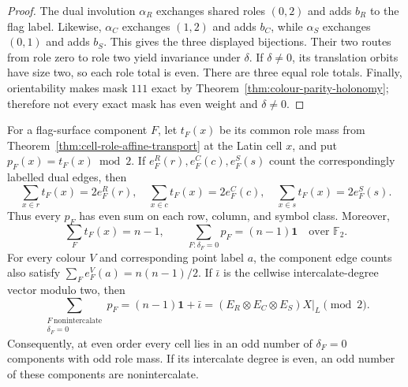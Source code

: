 \begin{proof}
The dual involution $\alpha_R$ exchanges shared roles $(0,2)$ and adds
$b_R$ to the flag label.  Likewise, $\alpha_C$ exchanges $(1,2)$ and adds
$b_C$, while $\alpha_S$ exchanges $(0,1)$ and adds $b_S$.  This gives the
three displayed bijections.
Their two routes from role zero to role two yield invariance under $\delta$.
If $\delta\ne0$, its translation orbits have size two, so each role total is
even.  There are three equal role totals.  Finally, orientability makes mask
$111$ exact by Theorem~\ref{thm:colour-parity-holonomy}; therefore not every
exact mask has even weight and $\delta\ne0$.
\end{proof}

\begin{theorem}
\label{thm:cross-component-cell-parity}
For a flag-surface component $F$, let $t_F(x)$ be its common role mass from
Theorem~\ref{thm:cell-role-affine-transport} at
the Latin cell $x$, and put $p_F(x)=t_F(x)\bmod2$.  If
$e^R_F(r),e^C_F(c),e^S_F(s)$ count the correspondingly labelled dual edges,
then
\[
 \sum_{x\in r}t_F(x)=2e^R_F(r),\quad
 \sum_{x\in c}t_F(x)=2e^C_F(c),\quad
 \sum_{x\in s}t_F(x)=2e^S_F(s).
\]
Thus every $p_F$ has even sum on each row, column, and symbol class.  Moreover,
\[
 \sum_F t_F(x)=n-1,
 \qquad
 \sum_{F:\delta_F=0}p_F=(n-1)\mathbf1
 \quad\text{over }\mathbb F_2.
\]
For every colour $V$ and corresponding point label $a$, the component edge
counts also satisfy $\sum_F e^V_F(a)=n(n-1)/2$.
If $\bar\iota$ is the cellwise intercalate-degree vector modulo two, then
\[
 \sum_{\substack{F\ \mathrm{nonintercalate}\\\delta_F=0}}p_F
   =(n-1)\mathbf1+\bar\iota
   =\left.(E_R\otimes E_C\otimes E_S)X\right|_L\pmod2.
\]
Consequently, at even order every cell lies in an odd number of
$\delta_F=0$ components with odd role mass.  If its intercalate degree is
even, an odd number of these components are nonintercalate.
\end{theorem}

